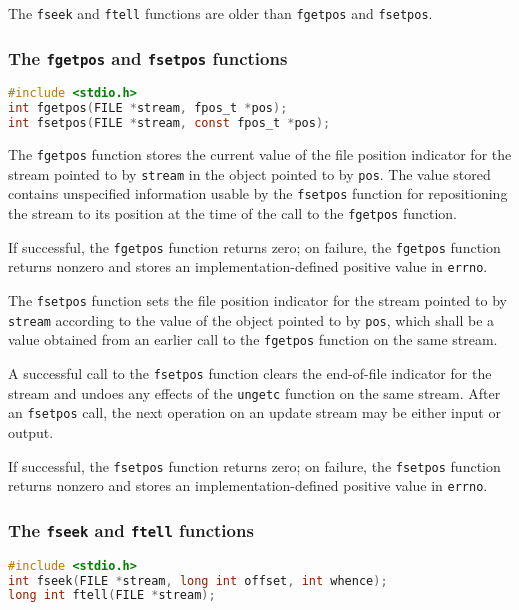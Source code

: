 The \texttt{fseek} and \texttt{ftell} functions are older than \texttt{fgetpos}
and \texttt{fsetpos}.

\subsubsection{The \texttt{fgetpos} and \texttt{fsetpos} functions}
\lstset{basicstyle=\scriptsize, numbers=left, captionpos=b, tabsize=4}
\begin{lstlisting}[caption=Section \thesection listing \arabic{filecnt},language={C},
breaklines=true,xleftmargin=15pt,label=lst:section\thesection listing\arabic{filecnt}]
#include <stdio.h>
int fgetpos(FILE *stream, fpos_t *pos);
int fsetpos(FILE *stream, const fpos_t *pos);
\end{lstlisting}

The \texttt{fgetpos} function stores the current value of the file position
indicator for the stream pointed to by \texttt{stream} in the object pointed to
by \texttt{pos}. The value stored contains unspecified information usable by
the \texttt{fsetpos} function for repositioning the stream to its position at
the time of the call to the \texttt{fgetpos} function.

If successful, the \texttt{fgetpos} function returns zero; on failure, the
\texttt{fgetpos} function returns nonzero and stores an implementation-defined
positive value in \texttt{errno}.

The \texttt{fsetpos} function sets the file position indicator for the stream
pointed to by \texttt{stream} according to the value of the object pointed to
by \texttt{pos}, which shall be a value obtained from an earlier call to the
\texttt{fgetpos} function on the same stream.

A successful call to the \texttt{fsetpos} function clears the end-of-file
indicator for the stream and undoes any effects of the \texttt{ungetc} function
on the same stream. After an \texttt{fsetpos} call, the next operation on an
update stream may be either input or output.

If successful, the \texttt{fsetpos} function returns zero; on failure, the
\texttt{fsetpos} function returns nonzero and stores an implementation-defined
positive value in \texttt{errno}.

\subsubsection{The \texttt{fseek} and \texttt{ftell} functions}
\lstset{basicstyle=\scriptsize, numbers=left, captionpos=b, tabsize=4}
\begin{lstlisting}[caption=Section \thesection listing \arabic{filecnt},language={C},
breaklines=true,xleftmargin=15pt,label=lst:section\thesection listing\arabic{filecnt}]
#include <stdio.h>
int fseek(FILE *stream, long int offset, int whence);
long int ftell(FILE *stream);
\end{lstlisting}

